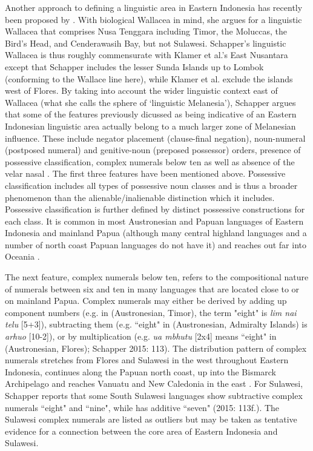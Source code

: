Another approach to defining a linguistic area in Eastern Indonesia has recently been proposed by \citet{schapper2015wallacea}. With biological Wallacea in mind, she argues for a linguistic Wallacea that comprises Nusa Tenggara including Timor, the Moluccas, the
Bird’s Head, and Cenderawasih Bay, but not Sulawesi. Schapper's linguistic Wallacea is thus roughly commensurate with Klamer et al.'s East Nusantara except that Schapper includes the lesser Sunda Islands up to Lombok (conforming to the Wallace line here), while Klamer et al. exclude the islands west of Flores. By taking into account the wider linguistic context east of Wallacea (what she calls the sphere of `linguistic Melanesia'), Schapper argues that some of the features previously dicussed as being indicative of an Eastern Indonesian linguistic area actually belong to a much larger zone of Melanesian influence. These include negator placement (clause-final negation), noun-numeral (postposed numeral) and genitive-noun (preposed possessor) orders, presence of possessive classification, complex numerals below ten as well as absence of the velar nasal . The first three features have been mentioned above. Possessive classification includes all types of possessive noun classes and is thus a broader phenomenon than the alienable/inalienable distinction which it includes. Possessive classification is further defined by distinct possessive constructions for each class. It is common in most Austronesian and Papuan languages of Eastern Indonesia and mainland Papua (although many central highland languages and a number of north coast Papuan languages do not have it) and reaches out far into Oceania \citep[109]{schapper2015wallacea}.

The next feature, complex numerals below ten, refers to the compositional nature of numerals between six and ten in many languages that are located close to or on mainland Papua. Complex numerals may either be derived by adding up component numbers (e.g. in  (Austronesian, Timor), the term "eight" is \textit{lim nai telu}
[5+3]), subtracting them (e.g. ``eight" in  (Austronesian, Admiralty Islands) is \textit{arhuo} [10-2]), or by multiplication (e.g. \textit{ua mbhutu} [2x4] means ``eight" in  (Austronesian, Flores); Schapper 2015: 113). The distribution pattern of complex numerals stretches from Flores and Sulawesi in the west throughout Eastern Indonesia, continues along the Papuan north coast, up into the Bismarck Archipelago and reaches Vanuatu and New Caledonia in the east \citep[112--4]{schapper2015wallacea}. For Sulawesi, Schapper reports that some South Sulawesi languages show subtractive complex numerals ``eight" and ``nine", while  has additive ``seven" (2015: 113f.). The Sulawesi complex numerals are listed as outliers but may be taken as tentative evidence for a connection between the core area of Eastern Indonesia and Sulawesi.

